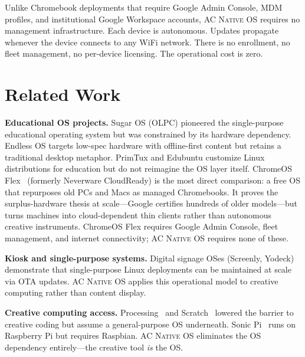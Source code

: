 \documentclass[10pt,letterpaper,twocolumn]{article}
\newcommand{\acos}{\textsc{AC Native OS}}
\begin{document}
Unlike Chromebook deployments that require Google Admin Console, MDM profiles, and institutional Google Workspace accounts, \acos{} requires no management infrastructure. Each device is autonomous. Updates propagate whenever the device connects to any WiFi network. There is no enrollment, no fleet management, no per-device licensing. The operational cost is zero.


\section{Related Work}
\label{sec:related}

\textbf{Educational OS projects.} Sugar OS (OLPC) pioneered the single-purpose educational operating system but was constrained by its hardware dependency. Endless OS targets low-spec hardware with offline-first content but retains a traditional desktop metaphor. PrimTux and Edubuntu customize Linux distributions for education but do not reimagine the OS layer itself. ChromeOS Flex~\citep{google2022chromeosflex} (formerly Neverware CloudReady) is the most direct comparison: a free OS that repurposes old PCs and Macs as managed Chromebooks. It proves the surplus-hardware thesis at scale---Google certifies hundreds of older models---but turns machines into cloud-dependent thin clients rather than autonomous creative instruments. ChromeOS Flex requires Google Admin Console, fleet management, and internet connectivity; \acos{} requires none of these.

\textbf{Kiosk and single-purpose systems.} Digital signage OSes (Screenly, Yodeck) demonstrate that single-purpose Linux deployments can be maintained at scale via OTA updates. \acos{} applies this operational model to creative computing rather than content display.

\textbf{Creative computing access.} Processing~\citep{reas2007processing} and Scratch~\citep{resnick2009scratch} lowered the barrier to creative coding but assume a general-purpose OS underneath. Sonic Pi~\citep{aaron2016sonic} runs on Raspberry Pi but requires Raspbian. \acos{} eliminates the OS dependency entirely---the creative tool \emph{is} the OS.
\end{document}

